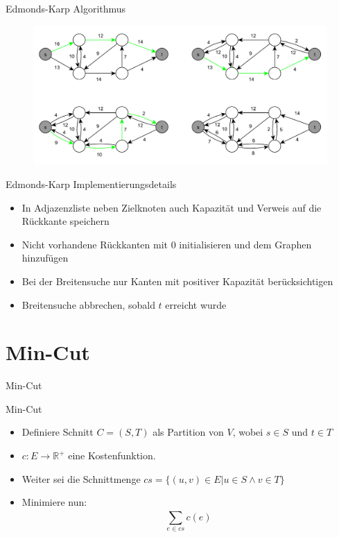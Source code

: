 \documentclass[18pt]{beamer}
\begin{document}
\begin{frame}{Edmonds-Karp Algorithmus}
\begin{figure}
	\includegraphics[width = \textwidth]{img/Jakob_Edmond.pdf}
\end{figure}
\end{frame}

\begin{frame}{Edmonds-Karp Implementierungsdetails}
\begin{itemize}
	\item In Adjazenzliste neben Zielknoten auch Kapazit\"at und Verweis auf die R\"uckkante speichern
	\item Nicht vorhandene R\"uckkanten mit 0 initialisieren und dem Graphen hinzuf\"ugen
	\item Bei der Breitensuche nur Kanten mit positiver Kapazit\"at ber\"ucksichtigen
	\item Breitensuche abbrechen, sobald $t$ erreicht wurde
\end{itemize}
\end{frame}


\section{Min-Cut}
\begin{frame}{Min-Cut}
\begin{block}{Min-Cut}

\begin{itemize}
\item Definiere Schnitt \(C = (S, T)\) als Partition von \(V\), wobei \(s \in S\) und \(t \in T\) 
\item $c: E \to \mathbb{R}^+$ eine Kostenfunktion.
\item Weiter sei die Schnittmenge \(cs = \{(u, v) \in E | u \in S \land v \in T\}\)
\item Minimiere nun: 
\begin{equation*}
	\displaystyle \sum_{e\in cs}^{} c(e)
\end{equation*} 
\end{itemize}
\end{block}
\end{frame}
\end{document}
